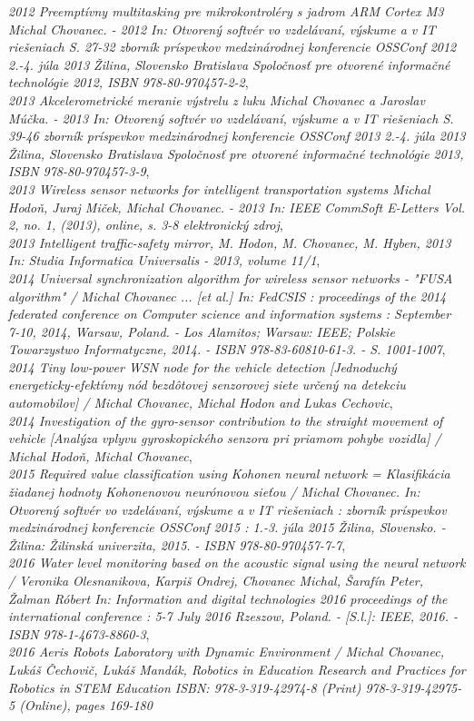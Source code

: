 \documentclass[english,a4paper]{europasscv}
\begin{document}
\begin{europasscv}
  {\textit{2012 Preemptívny multitasking pre mikrokontroléry s jadrom ARM Cortex M3 Michal Chovanec. - 2012 In: Otvorený softvér vo vzdelávaní, výskume a v IT riešeniach S. 27-32 zborník príspevkov medzinárodnej konferencie OSSConf 2012 2.-4. júla 2013 Žilina, Slovensko Bratislava Spoločnosť pre otvorené informačné technológie 2012, ISBN 978-80-970457-2-2}}, \\
  {\textit{2013 Akcelerometrické meranie výstrelu z luku Michal Chovanec a Jaroslav Múčka. - 2013 In: Otvorený softvér vo vzdelávaní, výskume a v IT riešeniach S. 39-46 zborník príspevkov medzinárodnej konferencie OSSConf 2013 2.-4. júla 2013 Žilina, Slovensko Bratislava Spoločnosť pre otvorené informačné technológie 2013, ISBN 978-80-970457-3-9}}, \\
  {\textit{2013 Wireless sensor networks for intelligent transportation systems Michal Hodoň, Juraj Miček, Michal Chovanec. - 2013 In: IEEE CommSoft E-Letters Vol. 2, no. 1, (2013), online, s. 3-8 elektronický zdroj}}, \\
  {\textit{2013 Intelligent traffic-safety mirror, M. Hodon, M. Chovanec, M. Hyben, 2013 In: Studia Informatica Universalis - 2013, volume 11/1}}, \\
  {\textit{2014 Universal synchronization algorithm for wireless sensor networks - "FUSA algorithm" / Michal Chovanec ... [et al.] In: FedCSIS : proceedings of the 2014 federated conference on Computer science and information systems : September 7-10, 2014, Warsaw, Poland. - Los Alamitos; Warsaw: IEEE; Polskie Towarzystwo Informatyczne, 2014. - ISBN 978-83-60810-61-3. - S. 1001-1007}}, \\
  {\textit{2014 Tiny low-power WSN node for the vehicle detection [Jednoduchý energeticky-efektívny nód bezdôtovej senzorovej siete určený na detekciu automobilov] / Michal Chovanec, Michal Hodon and Lukas Cechovic}}, \\
  {\textit{2014 Investigation of the gyro-sensor contribution to the straight movement of vehicle [Analýza vplyvu gyroskopického senzora pri priamom pohybe vozidla] / Michal Hodoň, Michal Chovanec}}, \\
  {\textit{2015  Required value classification using Kohonen neural network = Klasifikácia žiadanej hodnoty Kohonenovou neurónovou sieťou / Michal Chovanec.
  In: Otvorený softvér vo vzdelávaní, výskume a v IT riešeniach : zborník príspevkov medzinárodnej konferencie OSSConf 2015 : 1.-3. júla 2015 Žilina, Slovensko. - Žilina: Žilinská univerzita, 2015. - ISBN 978-80-970457-7-7}}, \\
  {\textit{2016 Water level monitoring based on the acoustic signal using the neural network / Veronika Olesnanikova, Karpiš Ondrej, Chovanec Michal, Šarafín Peter, Žalman Róbert
  In: Information and digital technologies 2016 proceedings of the international conference : 5-7 July 2016 Rzeszow, Poland. - [S.l.]: IEEE, 2016. - ISBN 978-1-4673-8860-3}}, \\
  {\textit{2016 Aeris Robots Laboratory with Dynamic Environment / Michal Chovanec, Lukáš Čechovič, Lukáš Mandák, Robotics in Education Research and Practices for Robotics in STEM Education ISBN: 978-3-319-42974-8 (Print) 978-3-319-42975-5 (Online), pages 169-180}}




  \end{europasscv}
\end{document}
